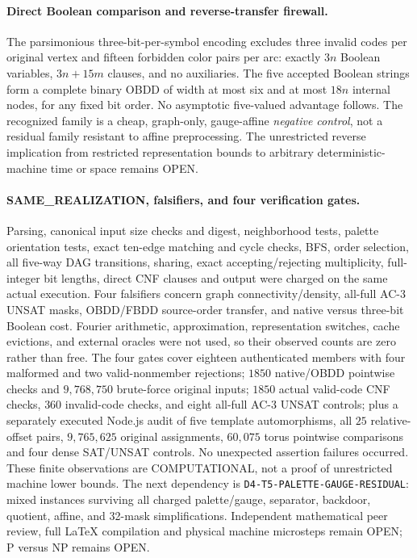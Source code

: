 \documentclass[11pt]{article}
\begin{document}
\paragraph{Direct Boolean comparison and reverse-transfer firewall.}
The parsimonious three-bit-per-symbol encoding excludes three invalid
codes per original vertex and fifteen forbidden color pairs per arc:
exactly $3n$ Boolean variables, $3n+15m$ clauses, and no auxiliaries.
The five accepted Boolean strings form a complete binary OBDD of width
at most six and at most $18n$ internal nodes, for any fixed bit order.
No asymptotic five-valued advantage follows. The recognized family
is a cheap, graph-only, gauge-affine \emph{negative control}, not a
residual family resistant to affine preprocessing. The unrestricted
reverse implication from restricted representation bounds to arbitrary
deterministic-machine time or space remains OPEN.

\paragraph{SAME\_REALIZATION, falsifiers, and four verification gates.}
Parsing, canonical input size checks and digest, neighborhood tests,
palette orientation tests, exact ten-edge matching and cycle checks,
BFS, order selection, all five-way DAG transitions, sharing,
exact accepting/rejecting multiplicity, full-integer bit lengths,
direct CNF clauses and output were charged on the same actual execution.
Four falsifiers concern graph connectivity/density, all-full AC-3
UNSAT masks, OBDD/FBDD source-order transfer, and native versus
three-bit Boolean cost. Fourier arithmetic, approximation,
representation switches, cache evictions, and external oracles were
not used, so their observed counts are zero rather than free.
The four gates cover eighteen authenticated members with four
malformed and two valid-nonmember rejections; $1850$ native/OBDD
pointwise checks and $9{,}768{,}750$ brute-force original inputs;
$1850$ actual valid-code CNF checks, $360$ invalid-code checks,
and eight all-full AC-3 UNSAT controls; plus a separately executed
Node.js audit of five template automorphisms, all $25$ relative-offset
pairs, $9{,}765{,}625$ original assignments, $60{,}075$ torus pointwise
comparisons and four dense SAT/UNSAT controls. No unexpected
assertion failures occurred. These finite observations are
COMPUTATIONAL, not a proof of unrestricted machine lower bounds.
The next dependency is
\texttt{D4-T5-PALETTE-GAUGE-RESIDUAL}: mixed instances surviving
all charged palette/gauge, separator, backdoor, quotient, affine,
and 32-mask simplifications. Independent mathematical peer review,
full \LaTeX{} compilation and physical machine microsteps remain
OPEN; P versus NP remains OPEN.
\end{document}
